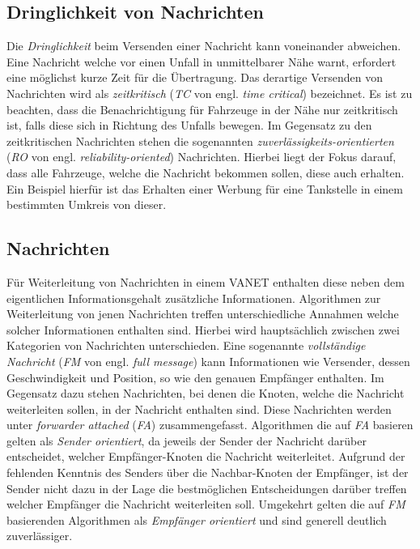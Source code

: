 \documentclass[english,runningheads,a4paper]{llncs}[2018/03/10]
\begin{document}
\subsection{Dringlichkeit von Nachrichten}
Die \textit{Dringlichkeit} beim Versenden einer Nachricht kann voneinander abweichen.
Eine Nachricht welche vor einen Unfall in unmittelbarer Nähe warnt, erfordert eine möglichst kurze Zeit für die Übertragung.
Das derartige Versenden von Nachrichten wird als \textit{zeitkritisch} (\textit{TC} von engl. \textit{time critical}) bezeichnet.
Es ist zu beachten, dass die Benachrichtigung für Fahrzeuge in der Nähe nur zeitkritisch ist, falls diese sich in Richtung des Unfalls bewegen.
Im Gegensatz zu den zeitkritischen Nachrichten stehen die sogenannten \textit{zuverlässigkeits-orientierten} (\textit{RO} von engl. \textit{reliability-oriented}) Nachrichten.
Hierbei liegt der Fokus darauf, dass alle Fahrzeuge, welche die Nachricht bekommen sollen, diese auch erhalten.
Ein Beispiel hierfür ist das Erhalten einer Werbung für eine Tankstelle in einem bestimmten Umkreis von dieser.

\subsection{Nachrichten}
Für Weiterleitung von Nachrichten in einem VANET enthalten diese neben dem eigentlichen Informationsgehalt zusätzliche Informationen.
Algorithmen zur Weiterleitung von jenen Nachrichten treffen unterschiedliche Annahmen welche solcher Informationen enthalten sind.
Hierbei wird hauptsächlich zwischen zwei Kategorien von Nachrichten unterschieden.
Eine sogenannte \textit{vollständige Nachricht} (\textit{FM} von engl. \textit{full message}) kann Informationen wie Versender, dessen Geschwindigkeit und Position, so wie den genauen Empfänger enthalten.
Im Gegensatz dazu stehen Nachrichten, bei denen die Knoten, welche die Nachricht weiterleiten sollen, in der Nachricht enthalten sind.
Diese Nachrichten werden unter \textit{forwarder attached} (\textit{FA}) zusammengefasst.
Algorithmen die auf \textit{FA} basieren gelten als \textit{Sender orientiert}, da jeweils der Sender der Nachricht darüber entscheidet, welcher Empfänger-Knoten die Nachricht weiterleitet.
Aufgrund der fehlenden Kenntnis des Senders über die Nachbar-Knoten der Empfänger, ist der Sender nicht dazu in der Lage die bestmöglichen Entscheidungen darüber treffen welcher Empfänger die Nachricht weiterleiten soll.
Umgekehrt gelten die auf \textit{FM} basierenden Algorithmen als \textit{Empfänger orientiert} und sind generell deutlich zuverlässiger.
\end{document}
